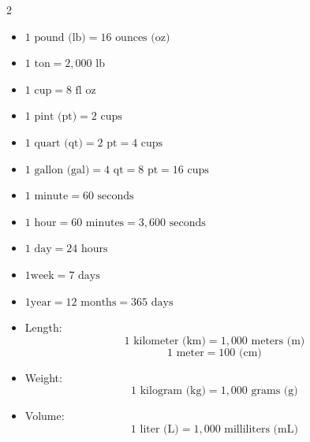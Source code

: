 \documentclass[12pt]{article}
\begin{document}
\begin{multicols}{2}
\begin{tcolorbox}[title=Weight (U.S. Customary)]
\begin{itemize}[left=0pt]
  \item \( 1 \text{ pound (lb)} = 16 \text{ ounces (oz)} \)
  \item \( 1 \text{ ton} = 2,000 \text{ lb} \)
\end{itemize}
\end{tcolorbox}

\begin{tcolorbox}[title=Liquid Volume (U.S. Customary)]
\begin{itemize}[left=0pt]
  \item \( 1 \text{ cup} = 8 \text{ fl oz} \)
  \item \( 1 \text{ pint (pt)} = 2 \text{ cups} \)
  \item \( 1 \text{ quart (qt)} = 2 \text{ pt} = 4 \text{ cups} \)
  \item \( 1 \text{ gallon (gal)} = 4 \text{ qt} = 8 \text{ pt} = 16 \text{ cups} \)
\end{itemize}
\end{tcolorbox}

\begin{tcolorbox}[title=Time]
\begin{itemize}[left=0pt]
  \item \( 1 \text{ minute} = 60 \text{ seconds} \)
  \item \( 1 \text{ hour} = 60 \text{ minutes} = 3,600 \text{ seconds} \)
  \item \( 1 \text{ day} = 24 \text{ hours} \)
  \item \( 1 \text{week} = 7 \text{ days} \)
  \item \( 1 \text{year} = 12 \text{ months} = 365 \text{ days} \)
\end{itemize}
\end{tcolorbox}

\begin{tcolorbox}[title=Metric System]
\begin{itemize}[left=0pt]
  \item Length: 
    \[
    1 \text{ kilometer (km)} = 1,000 \text{ meters (m)}
    \]
    \[
    1 \text{ meter} = 100 \text{ (cm)} 
    \]
  \item Weight:
    \[
    1 \text{ kilogram (kg)} = 1,000 \text{ grams (g)}
    \]
  \item Volume:
    \[
    1 \text{ liter (L)} = 1,000 \text{ milliliters (mL)}
    \]
\end{itemize}
\end{tcolorbox}


\end{multicols}
\end{document}
